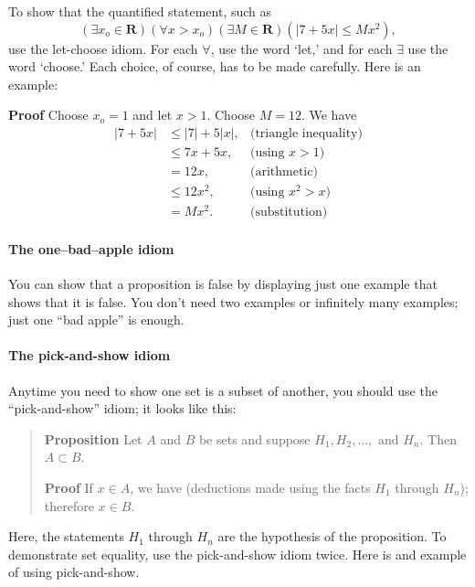 \documentclass[12pt,fleqn]{article}
\newcommand{\reals}{\mathbf{R}}
\newcounter{ex}\setcounter{ex}{0}
\newcounter{id}\setcounter{id}{0}
\newcounter{se}\setcounter{se}{0}
\begin{document}
To show that the quantified statement, such as
\begin{equation*}
  \left(\exists x_o \in \reals \right) \left(\forall x > x_o\right) 
\left(\exists M \in \reals \right)  \left(|7 + 5 x| \leq M x^2\right),
\end{equation*}
use the let-choose idiom. For each \(\forall\), use the word `let,' and for each \(\exists\) use the word `choose.' 
Each choice, of course, has to be made carefully. Here is an example:

\noindent \textbf{Proof} Choose \(x_o = 1\) and let \(x > 1\). Choose \(M = 12\).  We have
\begin{align*}
  |7 + 5 x| &\leq |7| + 5 |x|, &\mbox{(triangle inequality)} \\
            &\leq 7 x + 5 x,   &\mbox{(using } x > 1) \\
            &= 12 x,        &\mbox{(arithmetic)} \\
            &\leq 12 x^2,   &\mbox{(using } x^2 > x) \\
            &= M x^2.       &\mbox{(substitution)} 
\end{align*}



\paragraph{The one--bad--apple idiom}

You can show that a proposition is false by displaying just
one example that shows that it is false. You don't need two examples
or infinitely many examples; just one ``bad apple'' is enough.  





\paragraph{The pick-and-show idiom}

Anytime you need to show one set is a subset of another, you should use the
``pick-and-show'' idiom; it looks like this:

\begin{quote}

\textbf{Proposition} Let \(A\) and \(B\) be sets and suppose \(H_1, H_2 , \dots
,\mbox{ and } H_n\). Then  \(A \subset B\).

\vspace{0.1in}

\textbf{Proof} If \(x \in A\), we have (deductions made using the 
facts \(H_1\) through \(H_n\)); therefore \(x \in B\).

\end{quote}
Here, the statements \(H_1\) through \(H_n\) are the hypothesis of the
proposition. To demonstrate set equality, use the pick-and-show idiom twice. Here
is and example of using pick-and-show.
\end{document}
